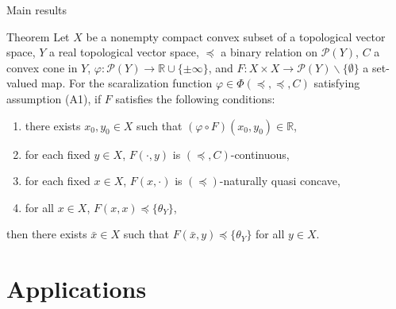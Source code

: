 \documentclass[aspectratio=169, dvipdfmx, 11pt]{beamer}
\newcommand{\RealNumberSet}{\mathbb{R}}
\begin{document}
\begin{frame}{Main results}
  \begin{block}{Theorem}
    Let $X$ be a nonempty compact convex subset of a topological vector space,
    $Y$ a real topological vector space, $\preccurlyeq$ a binary relation on $\mathcal{P}(Y)$,
    $C$ a convex cone in $Y$, $\varphi\colon \mathcal{P}(Y) \to \RealNumberSet \cup \{\pm \infty\}$,
    and $F\colon X \times X \to \mathcal{P}(Y) \backslash \{\emptyset\}$ a set-valued map.
    For the scaralization function $\varphi \in \Phi(\preceq, \preccurlyeq, C)$ satisfying assumption (A1),
    if $F$ satisfies the following conditions:
    \begin{enumerate}
      \item there exists $x_0, y_0 \in X$ such that $(\varphi \circ F)(x_0,y_0) \in \RealNumberSet$,
      \item for each fixed $y \in X$, $F(\cdot,y)$ is $(\preceq, C)$-continuous,
      \item for each fixed $x \in X$, $F(x,\cdot)$ is $(\preccurlyeq)$-naturally quasi concave,
      \item for all $x \in X$, $F(x,x) \preccurlyeq \{\theta_{Y}\}$,
    \end{enumerate}
    then there exists $\bar{x} \in X$ such that $ F(\bar{x},y) \preccurlyeq \{\theta_{Y}\} $ for all $y \in X$.
  \end{block}
\end{frame}

\section{Applications}
\end{document}
